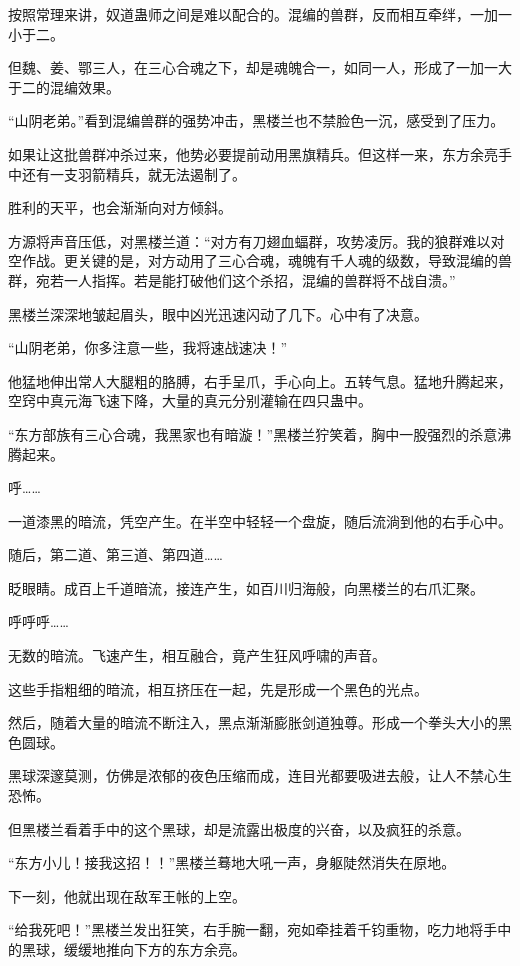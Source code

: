\begin{this_body}
按照常理来讲，奴道蛊师之间是难以配合的。混编的兽群，反而相互牵绊，一加一小于二。

但魏、姜、鄂三人，在三心合魂之下，却是魂魄合一，如同一人，形成了一加一大于二的混编效果。

“山阴老弟。”看到混编兽群的强势冲击，黑楼兰也不禁脸色一沉，感受到了压力。

如果让这批兽群冲杀过来，他势必要提前动用黑旗精兵。但这样一来，东方余亮手中还有一支羽箭精兵，就无法遏制了。

胜利的天平，也会渐渐向对方倾斜。

方源将声音压低，对黑楼兰道：“对方有刀翅血蝠群，攻势凌厉。我的狼群难以对空作战。更关键的是，对方动用了三心合魂，魂魄有千人魂的级数，导致混编的兽群，宛若一人指挥。若是能打破他们这个杀招，混编的兽群将不战自溃。”

黑楼兰深深地皱起眉头，眼中凶光迅速闪动了几下。心中有了决意。

“山阴老弟，你多注意一些，我将速战速决！”

他猛地伸出常人大腿粗的胳膊，右手呈爪，手心向上。五转气息。猛地升腾起来，空窍中真元海飞速下降，大量的真元分别灌输在四只蛊中。

“东方部族有三心合魂，我黑家也有暗漩！”黑楼兰狞笑着，胸中一股强烈的杀意沸腾起来。

呼……

一道漆黑的暗流，凭空产生。在半空中轻轻一个盘旋，随后流淌到他的右手心中。

随后，第二道、第三道、第四道……

眨眼睛。成百上千道暗流，接连产生，如百川归海般，向黑楼兰的右爪汇聚。

呼呼呼……

无数的暗流。飞速产生，相互融合，竟产生狂风呼啸的声音。

这些手指粗细的暗流，相互挤压在一起，先是形成一个黑色的光点。

然后，随着大量的暗流不断注入，黑点渐渐膨胀剑道独尊。形成一个拳头大小的黑色圆球。

黑球深邃莫测，仿佛是浓郁的夜色压缩而成，连目光都要吸进去般，让人不禁心生恐怖。

但黑楼兰看着手中的这个黑球，却是流露出极度的兴奋，以及疯狂的杀意。

“东方小儿！接我这招！！”黑楼兰蓦地大吼一声，身躯陡然消失在原地。

下一刻，他就出现在敌军王帐的上空。

“给我死吧！”黑楼兰发出狂笑，右手腕一翻，宛如牵挂着千钧重物，吃力地将手中的黑球，缓缓地推向下方的东方余亮。


\end{this_body}
